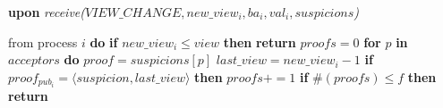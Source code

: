 \begin{algorithm}
\begin{algorithmic}[1]
		\State\textbf{upon} \textit{receive($VIEW\_CHANGE, new\_view_i, ba_i, val_i, suspicions$)} 
		\item[] from process $i$ \textbf{do} 
		\State\hspace{\algorithmicindent} \textbf{if} $new\_view_i \leq view$ \textbf{then}
		\State\hspace{\algorithmicindent}\hspace{\algorithmicindent}\textbf{return}
		\State
		\State\hspace{\algorithmicindent} $proofs = 0$
		\State\hspace{\algorithmicindent} \textbf{for} $p$ \textbf{in} $acceptors$ \textbf{do} 
		\State\hspace{\algorithmicindent}\hspace{\algorithmicindent} $proof = suspicions[p]$
		\State\hspace{\algorithmicindent}\hspace{\algorithmicindent} $last\_view = new\_view_i-1$
		\State\hspace{\algorithmicindent}\hspace{\algorithmicindent} \textbf{if} $proof_{pub_i} = \langle suspicion, last\_view \rangle$ \textbf{then}
		\State\hspace{\algorithmicindent}\hspace{\algorithmicindent}\hspace{\algorithmicindent} $proofs \mathrel{+{=}} 1$
		\State
		\State\hspace{\algorithmicindent} \textbf{if} $\#(proofs) \leq f$ \textbf{then}
		\State\hspace{\algorithmicindent}\hspace{\algorithmicindent} \textbf{return}
		

\end{algorithmic}
\end{algorithm}
